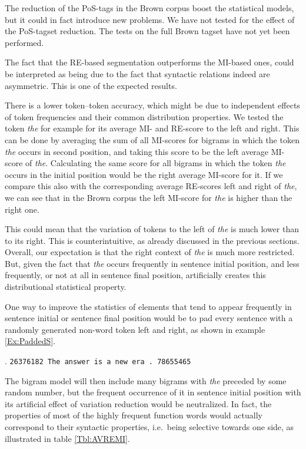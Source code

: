 \documentclass[11pt,a4paper,english]{article}
\begin{document}
The reduction of the PoS-tags in the Brown corpus boost the statistical models, but it could in fact introduce new problems. We have not tested for the effect of the PoS-tagset reduction. The tests on the full Brown tagset have not yet been performed.

The fact that the RE-based segmentation outperforms the MI-based ones, could be interpreted as being due to the fact that syntactic relations indeed are asymmetric. This is one of the expected results.

There is a lower token--token accuracy, which might be due to independent effects of token frequencies and their common distribution properties. We tested the token \textit{the} for example for its average MI- and RE-score to the left and right. This can be done by averaging the sum of all MI-scores for bigrams in which the token \textit{the} occurs in second position, and taking this score to be the left average MI-score of \textit{the}. Calculating the same score for all bigrams in which the token \textit{the} occurs in the initial position would be the right average MI-score for it. If we compare this also with the corresponding average RE-scores left and right of \textit{the}, we can see that in the Brown corpus the left MI-score for \textit{the} is higher than the right one.


This could mean that the variation of tokens to the left of \textit{the} is much lower than to its right. This is counterintuitive, as already discussed in the previous sections. Overall, our expectation is that the right context of \textit{the} is much more restricted. But, given the fact that \textit{the} occurs frequently in sentence initial position, and less frequently, or not at all in sentence final position, artificially creates this distributional statistical property.

One way to improve the statistics of elements that tend to appear frequently in sentence initial or sentence final position would be to pad every sentence with a randomly generated non-word token left and right, as shown in example \ref{Ex:PaddedS}.

\ex.\label{Ex:PaddedS} \texttt{26376182 The answer is a new era . 78655465}

The bigram model will then include many bigrams with \textit{the} preceded by some random number, but the frequent occurrence of it in sentence initial position with its artificial effect of variation reduction would be neutralized. In fact, the properties of most of the highly frequent function words would actually correspond to their syntactic properties, i.e.\ being selective towards one side, as illustrated in table \ref{Tbl:AVREMI}.
\end{document}

